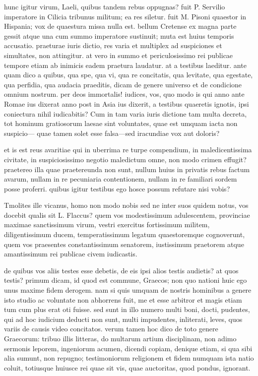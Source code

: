  hunc igitur virum, Laeli, quibus tandem rebus oppugnas? fuit P. Servilio imperatore in Cilicia tribunus militum; ea res siletur. fuit M. Pisoni quaestor in Hispania; vox de quaestura missa nulla est. bellum Cretense ex magna parte gessit atque una cum summo imperatore sustinuit; muta est huius temporis accusatio. praeturae iuris dictio, res varia et multiplex ad suspiciones et simultates, non attingitur. at vero in summo et periculosissimo rei publicae tempore etiam ab inimicis eadem praetura laudatur. at a testibus laeditur. ante quam dico a quibus, qua spe, qua vi, qua re concitatis, qua levitate, qua egestate, qua perfidia, qua audacia praeditis, dicam de genere universo et de condicione omnium nostrum. per deos immortalis! iudices, vos, quo modo is qui anno ante Romae ius dixerat anno post in Asia ius dixerit, a testibus quaeretis ignotis, ipsi coniectura nihil iudicabitis? Cum in tam varia iuris dictione tam multa decreta, tot hominum gratiosorum laesae sint voluntates, quae est umquam iacta non suspicio— quae tamen solet esse falsa—sed iracundiae vox aut doloris?

 et is est reus avaritiae qui in uberrima re turpe compendium, in maledicentissima civitate, in suspiciosissimo negotio maledictum omne, non modo crimen effugit? praetereo illa quae praetereunda non sunt, nullum huius in privatis rebus factum avarum, nullam in re pecuniaria contentionem, nullam in re familiari sordem posse proferri. quibus igitur testibus ego hosce possum refutare nisi vobis?

 Tmolites ille vicanus, homo non modo nobis sed ne inter suos quidem notus, vos docebit qualis sit L. Flaccus? quem vos modestissimum adulescentem, provinciae maximae sanctissimum virum, vestri exercitus fortissimum militem, diligentissimum ducem, temperatissimum legatum quaestoremque cognoverunt, quem vos praesentes constantissimum senatorem, iustissimum praetorem atque amantissimum rei publicae civem iudicastis.

 de quibus vos aliis testes esse debetis, de eis ipsi alios testis audietis? at quos testis? primum dicam, id quod est commune, Graecos; non quo nationi huic ego unus maxime fidem derogem. nam si quis umquam de nostris hominibus a genere isto studio ac voluntate non abhorrens fuit, me et esse arbitror et magis etiam tum cum plus erat oti fuisse. sed sunt in illo numero multi boni, docti, pudentes, qui ad hoc iudicium deducti non sunt, multi impudentes, inliterati, leves, quos variis de causis video concitatos. verum tamen hoc dico de toto genere Graecorum: tribuo illis litteras, do multarum artium disciplinam, non adimo sermonis leporem, ingeniorum acumen, dicendi copiam, denique etiam, si qua sibi alia sumunt, non repugno; testimoniorum religionem et fidem numquam ista natio coluit, totiusque huiusce rei quae sit vis, quae auctoritas, quod pondus, ignorant.

